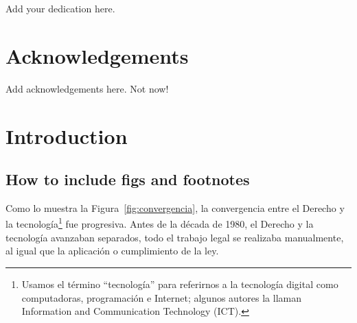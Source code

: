 \documentclass[12pt]{report} %
\begin{document}
\newpage
\thispagestyle{empty}
\begin{flushright}
Add your dedication here.
\end{flushright}

\chapter*{Acknowledgements}
\thispagestyle{empty}
Add acknowledgements here.  Not now!





\tableofcontents
\thispagestyle{fancy}

\listoffigures
\thispagestyle{fancy}

\listoftables
\thispagestyle{fancy}

\clearpage
{} %




\clearpage
\glsaddall
\printglossary[title=Glosario, toctitle=List of terms] 
 

\printglossary[title= Abreviaciones, type=\acronymtype]



\chapter{Introduction}


\section{How to include figs and footnotes}
Como lo muestra la Figura~\ref{fig:convergencia}, la convergencia entre el Derecho y la tecnología\footnote{Usamos el término “tecnología” para referirnos a la tecnología digital como computadoras, programación e Internet; algunos autores la llaman Information and Communication Technology (ICT).} fue progresiva. Antes de la década de 1980, el Derecho y la tecnología avanzaban separados, todo el trabajo legal se realizaba manualmente, al igual que la aplicación o cumplimiento de la ley.
\end{document}
